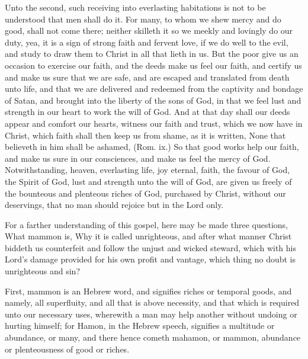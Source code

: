 Unto the second, such receiving into everlasting habitations
is not to be understood that men shall do it. For 
many, to whom we shew mercy and do good, shall not 
come there; neither skilleth it so we meekly and lovingly 
do our duty, yea, it is a sign of strong faith and fervent
love, if we do well to the evil, and study to draw them 
to Christ in all that lieth in us. But the poor give us an 
occasion to exercise our faith, and the deeds make us feel 
our faith, and certify us and make us sure that we are safe, 
and are escaped and translated from death unto life, and 
that we are delivered and redeemed from the captivity and 
bondage of Satan, and brought into the liberty of the sons 
of God, in that we feel lust and strength in our heart to 
work the will of God. And at that day shall our deeds appear
and comfort our hearts, witness our faith and trust, 
which we now have in Christ, which faith shall then keep us 
from shame, as it is written, None that believeth in him shall 
be ashamed, (Rom. ix.) So that good works help our faith, 
and make us sure in our consciences, and make us feel the 
mercy of God. Notwithstanding, heaven, everlasting life, 
joy eternal, faith, the favour of God, the Spirit of God, lust 
and strength unto the will of God, are given us freely of the 
bounteous and plenteous riches of God, purchased by 
Christ, without our deservings, that no man should rejoice 
but in the Lord only. 

For a farther understanding of this gospel, here may be 
made three questions, What mammon is, Why it is called unrighteous,
and after what manner Christ biddeth us counterfeit
and follow the unjust and wicked steward, which with 
his Lord's damage provided for his own profit and vantage, 
which thing no doubt is unrighteous and sin? 

First, mammon is an Hebrew word, and signifies riches 
or temporal goods, and namely, all superfluity, and all that 
is above necessity, and that which is required unto our necessary
uses, wherewith a man may help another without 
undoing or hurting himself; for Hamon, in the Hebrew 
speech, signifies a multitude or abundance, or many, and 
there hence cometh mahamon, or mammon, abundance or 
plenteousness of good or riches. 

